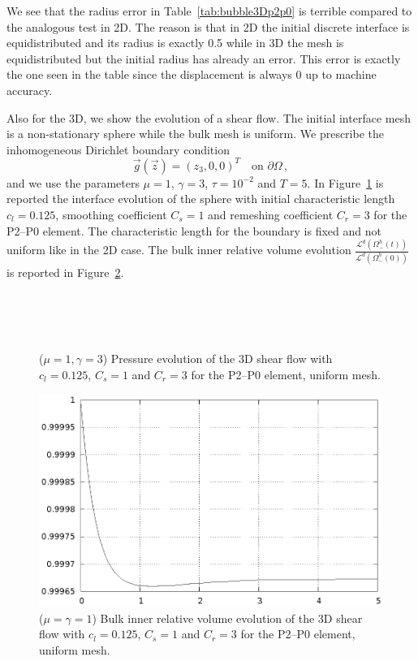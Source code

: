 \documentclass[a4paper,12pt,onecolumn]{article}
\begin{document}
We see that the radius error in Table~\ref{tab:bubble3Dp2p0} is terrible compared to the analogous test in 2D. The reason is that in 2D the initial discrete interface is equidistributed and its radius is exactly 0.5 while in 3D the mesh is equidistributed but the initial radius has already an error. This error is exactly the one seen in the table since the displacement is always 0 up to machine accuracy. 

Also for the 3D, we show the evolution of a shear flow. The initial interface mesh is a non-stationary sphere while the bulk mesh is uniform. We prescribe the inhomogeneous Dirichlet boundary condition
\begin{equation*}
\vec g(\vec z)=(z_3,0,0)^T\quad \mbox{on }\partial\Omega\,,
\end{equation*}
and we use the parameters $\mu=1$, $\gamma=3$, $\tau=10^{-2}$ and $T=5$. In Figure~\ref{fig:shear_3d} is reported the interface evolution of the sphere with initial characteristic length $c_l=0.125$, smoothing coefficient $C_s=1$ and remeshing coefficient $C_r=3$ for the P2--P0 element. The characteristic length for the boundary is fixed and not uniform like in the 2D case. The bulk inner relative volume evolution $\frac{\mathcal{L}^d(\Omega^h_-(t))}{\mathcal{L}^d(\Omega^h_-(0))}$ is reported in Figure~\ref{fig:shear_3d_bulk_inner_volume}.
\begin{figure}[htbp]
  \centering
  \\
  \quad
  \\
  \quad
  \\
  \caption{($\mu=1,\gamma=3$) Pressure evolution of the 3D shear flow with $c_l=0.125$, $C_s=1$ and $C_r=3$ for the P2--P0 element, uniform mesh.}
  \label{fig:shear_3d}
\end{figure}

\begin{figure}[htbp]
  \centering
  \includegraphics[width=.45\textwidth]{images/3d_shear_bulk_inner_volume.ps}
  \caption{($\mu=\gamma=1$) Bulk inner relative volume evolution of the 3D shear flow with $c_l=0.125$, $C_s=1$ and $C_r=3$ for the P2--P0 element, uniform mesh.}
  \label{fig:shear_3d_bulk_inner_volume}
\end{figure}
\end{document}
